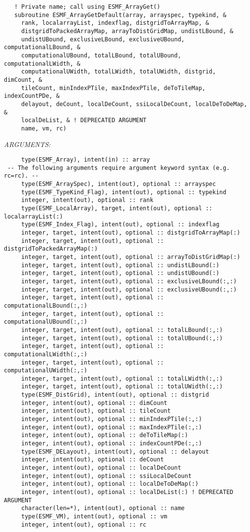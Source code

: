\begin{verbatim}   ! Private name; call using ESMF_ArrayGet()
   subroutine ESMF_ArrayGetDefault(array, arrayspec, typekind, &
     rank, localarrayList, indexflag, distgridToArrayMap, &
     distgridToPackedArrayMap, arrayToDistGridMap, undistLBound, &
     undistUBound, exclusiveLBound, exclusiveUBound, computationalLBound, &
     computationalUBound, totalLBound, totalUBound, computationalLWidth, &
     computationalUWidth, totalLWidth, totalUWidth, distgrid, dimCount, &
     tileCount, minIndexPTile, maxIndexPTile, deToTileMap, indexCountPDe, &
     delayout, deCount, localDeCount, ssiLocalDeCount, localDeToDeMap, &
     localDeList, & ! DEPRECATED ARGUMENT
     name, vm, rc)\end{verbatim}{\em ARGUMENTS:}
\begin{verbatim}     type(ESMF_Array), intent(in) :: array
 -- The following arguments require argument keyword syntax (e.g. rc=rc). --
     type(ESMF_ArraySpec), intent(out), optional :: arrayspec
     type(ESMF_TypeKind_Flag), intent(out), optional :: typekind
     integer, intent(out), optional :: rank
     type(ESMF_LocalArray), target, intent(out), optional :: localarrayList(:)
     type(ESMF_Index_Flag), intent(out), optional :: indexflag
     integer, target, intent(out), optional :: distgridToArrayMap(:)
     integer, target, intent(out), optional :: distgridToPackedArrayMap(:)
     integer, target, intent(out), optional :: arrayToDistGridMap(:)
     integer, target, intent(out), optional :: undistLBound(:)
     integer, target, intent(out), optional :: undistUBound(:)
     integer, target, intent(out), optional :: exclusiveLBound(:,:)
     integer, target, intent(out), optional :: exclusiveUBound(:,:)
     integer, target, intent(out), optional :: computationalLBound(:,:)
     integer, target, intent(out), optional :: computationalUBound(:,:)
     integer, target, intent(out), optional :: totalLBound(:,:)
     integer, target, intent(out), optional :: totalUBound(:,:)
     integer, target, intent(out), optional :: computationalLWidth(:,:)
     integer, target, intent(out), optional :: computationalUWidth(:,:)
     integer, target, intent(out), optional :: totalLWidth(:,:)
     integer, target, intent(out), optional :: totalUWidth(:,:)
     type(ESMF_DistGrid), intent(out), optional :: distgrid
     integer, intent(out), optional :: dimCount
     integer, intent(out), optional :: tileCount
     integer, intent(out), optional :: minIndexPTile(:,:)
     integer, intent(out), optional :: maxIndexPTile(:,:)
     integer, intent(out), optional :: deToTileMap(:)
     integer, intent(out), optional :: indexCountPDe(:,:)
     type(ESMF_DELayout), intent(out), optional :: delayout
     integer, intent(out), optional :: deCount
     integer, intent(out), optional :: localDeCount
     integer, intent(out), optional :: ssiLocalDeCount
     integer, intent(out), optional :: localDeToDeMap(:)
     integer, intent(out), optional :: localDeList(:) ! DEPRECATED ARGUMENT
     character(len=*), intent(out), optional :: name
     type(ESMF_VM), intent(out), optional :: vm
     integer, intent(out), optional :: rc\end{verbatim}
